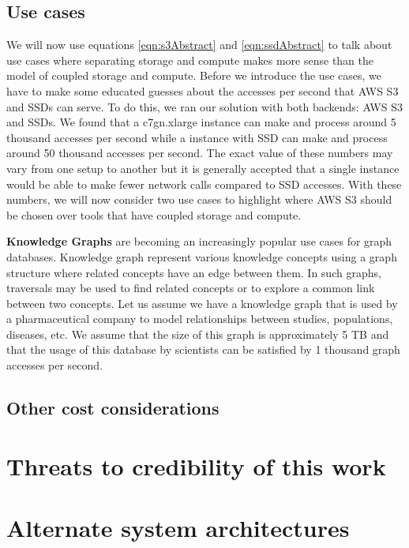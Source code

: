 \subsection{Use cases}
We will now use equations \ref{eqn:s3Abstract} and \ref{eqn:ssdAbstract} to talk
about use cases where separating storage and compute makes more sense than the
model of coupled storage and compute. Before we introduce the use cases, we have
to make some educated guesses about the accesses per second that AWS S3 and SSDs
can serve. To do this, we ran our solution with both backends: AWS S3 and SSDs.
We found that a c7gn.xlarge instance can make and process around 5
thousand accesses per second while a instance with SSD can make and process
around 50 thousand accesses per second. The exact value of these numbers may
vary from one setup to another but it is generally accepted that a single
instance would be able to make fewer network calls compared to SSD accesses.
With these numbers, we will now consider two use cases to highlight where AWS S3
should be chosen over tools that have coupled storage and compute.

\medskip
\textbf{Knowledge Graphs} are becoming an increasingly popular use cases for
graph databases. Knowledge graph represent various knowledge concepts using a
graph structure where related concepts have an edge between them. In such
graphs, traversals may be used to find related concepts or to explore a common
link between two concepts. Let us assume we have a knowledge graph that is used
by a pharmaceutical company to model relationships between studies, populations,
diseases, etc. We assume that the size of this graph is approximately 5 TB and
that the usage of this database by scientists can be satisfied by 1 thousand
graph accesses per second. 

\subsection{Other cost considerations}

\section{Threats to credibility of this work}\label{sec:threats}
\section{Alternate system architectures}\label{sec:altArchitectures}
